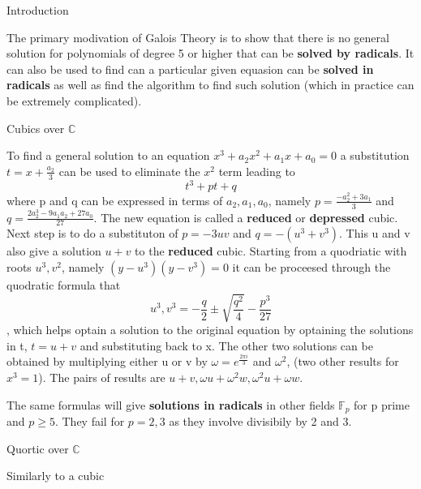 \documentclass[12pt, letterpaper]{article}
\begin{document}
\begin{section}{Introduction}

  The primary modivation of Galois Theory is to show that there is no general
  solution for polynomials of degree 5 or higher that can be \textbf{solved by
  radicals}. It can also be used to find can a particular given equasion can be
  \textbf{solved in radicals} as well as find the algorithm to find such
  solution (which in practice can be extremely complicated).

  \begin{subsection}{Cubics over \(\mathbb{C}\)}


    To find a general solution to an equation
    \(x^{3} + a_{2}x^{2} + a_{1}x + a_{0} = 0\) a substitution
    \(t = x + \frac{a_{2}}{3}\) can be used to eliminate the \(x^{2}\) term
    leading to \[t^{3} + pt + q\] where p and q can be expressed in terms of
    \(a_{2}, a_{1}, a_{0}\), namely \(p = \frac{-a^{2}_{2} + 3a_{1}}{3}\) and
    \(q = \frac{2a^{3}_{2} -9a_{1}a_{2} + 27a_{0}}{27}\). The new equation is
    called a \textbf{reduced} or \textbf{depressed} cubic. Next step is to do a
    substituton of \(p = -3uv\) and \(q = -(u^{3} + v^{3})\). This u and v also
    give a solution \(u + v\) to the \textbf{reduced} cubic. Starting from a
    quodriatic with roots \(u^{3}, v^{2}\), namely
    \((y - u^{3})(y - v^{3}) = 0\) it can be proceesed through the quodratic
    formula
    that \[u^{3}, v^{3} = -\frac{q}{2} \pm \sqrt{\frac{q^{2}}{4}} - \frac{p^{3}}{27}\],
    which helps optain a solution to the original equation by optaining the
    solutions in t, \(t = u + v\) and substituting back to x. The other two
    solutions can be obtained by multiplying either u or v by
    \(\omega = e^{\frac{2\pi i}{3}}\) and \(\omega^{2}\), (two other results for
    \(x^{3} = 1\)). The pairs of results are
    \(u + v, \omega u + \omega^{2} w, \omega^{2} u + \omega w\).

    The same formulas will give \textbf{solutions in radicals} in other fields
    \(\mathbb{F}_{p}\) for p prime and \(p \geq 5\). They fail for \(p = 2, 3\)
    as they involve divisibily by 2 and 3.

  \end{subsection}

  \begin{subsection}{Quortic over \(\mathbb{C}\)}

    Similarly to a cubic

  \end{subsection}

\end{section}
\end{document}
